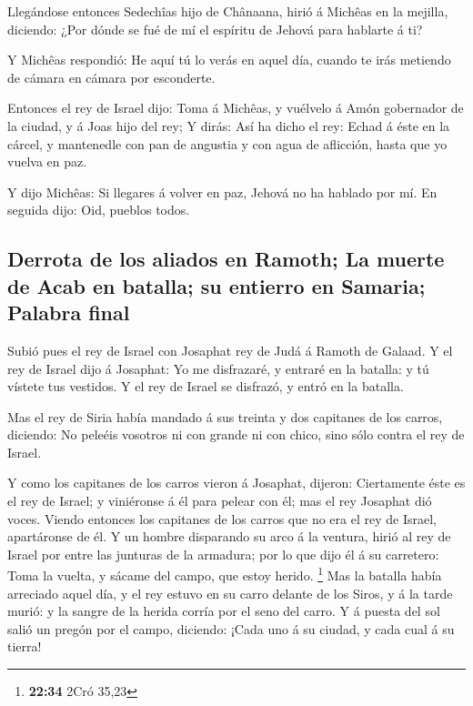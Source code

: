 Llegándose entonces Sedechîas hijo de Chânaana, hirió á
Michêas en la mejilla, diciendo: ¿Por dónde se fué de mí el espíritu de
Jehová para hablarte á ti?

 Y Michêas respondió: He aquí tú lo verás en aquel día,
cuando te irás metiendo de cámara en cámara por esconderte.

 Entonces el rey de Israel dijo: Toma á Michêas, y vuélvelo
á Amón gobernador de la ciudad, y á Joas hijo del rey;  Y
dirás: Así ha dicho el rey: Echad á éste en la cárcel, y mantenedle con
pan de angustia y con agua de aflicción, hasta que yo vuelva en paz.

 Y dijo Michêas: Si llegares á volver en paz, Jehová no ha
hablado por mí. En seguida dijo: Oid, pueblos todos.

\hypertarget{derrota-de-los-aliados-en-ramoth-la-muerte-de-acab-en-batalla-su-entierro-en-samaria-palabra-final}{%
\subsection{Derrota de los aliados en Ramoth; La muerte de Acab en
batalla; su entierro en Samaria; Palabra
final}\label{derrota-de-los-aliados-en-ramoth-la-muerte-de-acab-en-batalla-su-entierro-en-samaria-palabra-final}}

 Subió pues el rey de Israel con Josaphat rey de Judá á
Ramoth de Galaad.  Y el rey de Israel dijo á Josaphat: Yo
me disfrazaré, y entraré en la batalla: y tú vístete tus vestidos. Y el
rey de Israel se disfrazó, y entró en la batalla.

 Mas el rey de Siria había mandado á sus treinta y dos
capitanes de los carros, diciendo: No peleéis vosotros ni con grande ni
con chico, sino sólo contra el rey de Israel.

 Y como los capitanes de los carros vieron á Josaphat,
dijeron: Ciertamente éste es el rey de Israel; y viniéronse á él para
pelear con él; mas el rey Josaphat dió voces.  Viendo
entonces los capitanes de los carros que no era el rey de Israel,
apartáronse de él.  Y un hombre disparando su arco á la
ventura, hirió al rey de Israel por entre las junturas de la armadura;
por lo que dijo él á su carretero: Toma la vuelta, y sácame del campo,
que estoy herido. \footnote{\textbf{22:34} 2Cró 35,23}  Mas
la batalla había arreciado aquel día, y el rey estuvo en su carro
delante de los Siros, y á la tarde murió: y la sangre de la herida
corría por el seno del carro.  Y á puesta del sol salió un
pregón por el campo, diciendo: ¡Cada uno á su ciudad, y cada cual á su
tierra!

